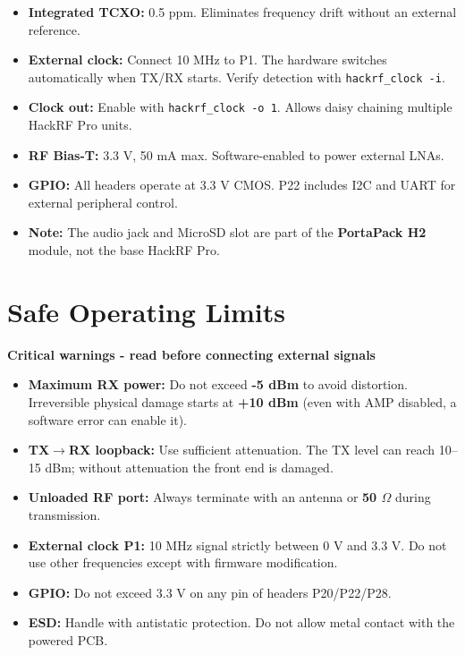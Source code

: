 \documentclass[11pt]{article}
\begin{document}
\begin{itemize}
    \item \textbf{Integrated TCXO:} 0.5 ppm. Eliminates frequency drift without an external reference.
    \item \textbf{External clock:} Connect 10 MHz to P1. The hardware switches automatically when TX/RX starts. Verify detection with \texttt{hackrf\_clock -i}.
    \item \textbf{Clock out:} Enable with \texttt{hackrf\_clock -o 1}. Allows daisy chaining multiple HackRF Pro units.
    \item \textbf{RF Bias-T:} 3.3 V, 50 mA max. Software-enabled to power external LNAs.
    \item \textbf{GPIO:} All headers operate at 3.3 V CMOS. P22 includes I2C and UART for external peripheral control.
    \item \textbf{Note:} The audio jack and MicroSD slot are part of the \textbf{PortaPack H2} module, not the base HackRF Pro.
\end{itemize}

\section{Safe Operating Limits}

\begin{warningbox}
\textbf{Critical warnings - read before connecting external signals}
\end{warningbox}

\vspace{4pt}
\begin{itemize}
    \item \textbf{Maximum RX power:} Do not exceed \textbf{-5 dBm} to avoid distortion. Irreversible physical damage starts at \textbf{+10 dBm} (even with AMP disabled, a software error can enable it).
    \item \textbf{TX$\to$RX loopback:} Use sufficient attenuation. The TX level can reach 10--15 dBm; without attenuation the front end is damaged.
    \item \textbf{Unloaded RF port:} Always terminate with an antenna or \textbf{50 $\Omega$} during transmission.
    \item \textbf{External clock P1:} 10 MHz signal strictly between 0 V and 3.3 V. Do not use other frequencies except with firmware modification.
    \item \textbf{GPIO:} Do not exceed 3.3 V on any pin of headers P20/P22/P28.
    \item \textbf{ESD:} Handle with antistatic protection. Do not allow metal contact with the powered PCB.
\end{itemize}
\end{document}

